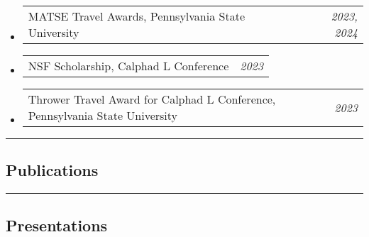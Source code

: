 \documentclass[10pt,letterpaper]{article}
\makeatletter
\newcommand{\headerrow}[2]
{\begin{tabular*}{\linewidth}{l@{\extracolsep{\fill}}r}
  #1 &
  #2 \\
\end{tabular*}}
\makeatother
\begin{document}
\begin{itemize}
  \parskip=0.1em
  \item  
  \headerrow
    {MATSE Travel Awards, Pennsylvania State University} {\emph{2023, 2024}}
  \item
  \headerrow
    {NSF Scholarship, Calphad L Conference} {\emph{2023}}
  \item  
  \headerrow
    {Thrower Travel Award for Calphad L Conference, Pennsylvania State University} {\emph{2023}}
\end{itemize}


\hrule
\vspace{-0.6em}
\subsection*{Publications}



\hrule
\vspace{-0.6em}
\subsection*{Presentations}


\end{document}
